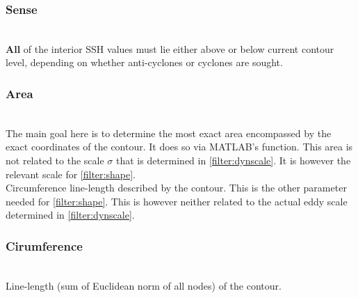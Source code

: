\subsubsection{Sense}
\\
\textbf{All} of the interior SSH values must lie either above or below current
contour level, depending on whether anti-cyclones or cyclones are sought.
\subsubsection{Area} \label{filter:area}
\\
The main goal here is to determine the most exact area encompassed by the exact coordinates of the contour. It does so via MATLAB's  function. This area is not related to the scale $\sigma$ that is determined in \ref{filter:dynscale}. It is however the relevant scale for \ref{filter:shape}.
\\
Circumference \eg line-length described by the contour. This is the other parameter needed for \ref{filter:shape}. This is however neither related to the actual eddy scale determined in
\ref{filter:dynscale}.
\subsubsection{Cirumference}
\\
Line-length (sum of Euclidean norm of all nodes) of the contour.
\newpage

